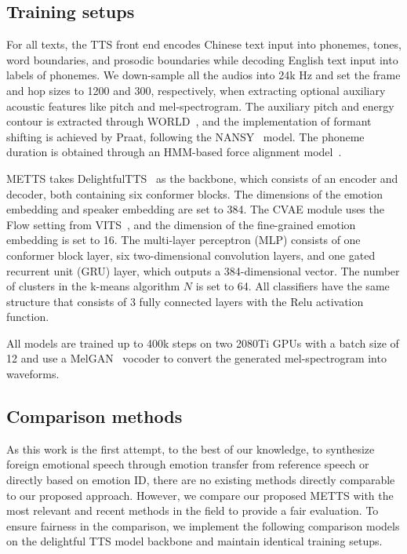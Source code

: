 \documentclass[journal,comsoc]{IEEEtran}
\begin{document}
\subsection{Training setups}
\label{exset}

For all texts, the TTS front end encodes Chinese text input into phonemes, tones, word boundaries, and prosodic boundaries while decoding English text input into labels of phonemes. We down-sample all the audios into 24k Hz and set the frame and hop sizes to 1200 and 300, respectively, when extracting optional auxiliary acoustic features like pitch and mel-spectrogram. The auxiliary pitch and energy contour is extracted through WORLD~\cite{DBLP:journals/ieicet/MoriseYO16}, and the implementation of formant shifting is achieved by Praat, following the NANSY~\cite{DBLP:conf/nips/ChoiLKLHL21} model. The phoneme duration is obtained through an HMM-based force alignment model~\cite{Sjlander2003AnHS}.

METTS takes DelightfulTTS~\cite{DBLP:journals/corr/abs-2110-12612} as the backbone, which consists of an encoder and decoder, both containing six conformer blocks. The dimensions of the emotion embedding and speaker embedding are set to 384. The CVAE module uses the Flow setting from VITS~\cite{DBLP:conf/icml/KimKS21}, and the dimension of the fine-grained emotion embedding is set to 16. The multi-layer perceptron (MLP) consists of one conformer block layer, six two-dimensional convolution layers, and one gated recurrent unit (GRU) layer, which outputs a 384-dimensional vector. The number of clusters in the k-means algorithm $N$ is set to 64. All classifiers have the same structure that consists of 3 fully connected layers with the Relu activation function.

All models are trained up to 400k steps on two 2080Ti GPUs with a batch size of 12 and use a MelGAN~\cite{DBLP:conf/nips/KumarKBGTSBBC19} vocoder to convert the generated mel-spectrogram into waveforms.


\subsection{Comparison methods}

As this work is the first attempt, to the best of our knowledge, to synthesize foreign emotional speech through emotion transfer from reference speech or directly based on emotion ID, there are no existing methods directly comparable to our proposed approach. However, we compare our proposed METTS with the most relevant and recent methods in the field to provide a fair evaluation.
To ensure fairness in the comparison, we implement the following comparison models on the delightful TTS model backbone and maintain identical training setups.
\end{document}
